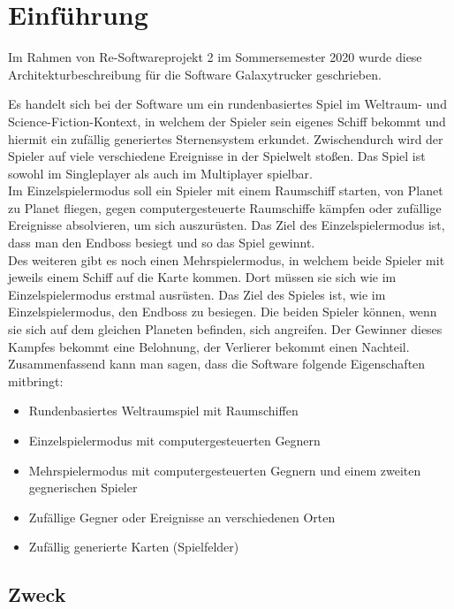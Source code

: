 \documentclass[fontsize=12pt,paper=a4,twoside]{scrartcl}
\begin{document}
\section{Einführung}

Im Rahmen von Re-Softwareprojekt 2 im Sommersemester 2020 wurde diese Architekturbeschreibung für die Software Galaxytrucker geschrieben.

Es handelt sich bei der Software um ein rundenbasiertes Spiel im Weltraum- und Science-Fiction-Kontext, in welchem der Spieler sein eigenes Schiff bekommt und hiermit ein zufällig generiertes Sternensystem erkundet. Zwischendurch wird der Spieler auf viele verschiedene Ereignisse in der Spielwelt stoßen. 
Das Spiel ist sowohl im Singleplayer als auch im Multiplayer spielbar.\\
Im Einzelspielermodus soll ein Spieler mit einem Raumschiff starten, von Planet zu Planet fliegen, gegen computergesteuerte Raumschiffe kämpfen oder zufällige Ereignisse absolvieren, um sich auszurüsten. Das Ziel des Einzelspielermodus ist, dass man den Endboss besiegt und so das Spiel gewinnt. \\
Des weiteren gibt es noch einen Mehrspielermodus, in welchem beide Spieler mit jeweils einem Schiff auf die Karte kommen. Dort müssen sie sich wie im Einzelspielermodus erstmal ausrüsten. Das Ziel des Spieles ist, wie im Einzelspielermodus, den Endboss zu besiegen. Die beiden Spieler können, wenn sie sich auf dem gleichen Planeten befinden, sich angreifen. Der Gewinner dieses Kampfes bekommt eine Belohnung, der Verlierer bekommt einen Nachteil. 
Zusammenfassend kann man sagen, dass die Software folgende Eigenschaften mitbringt: 

\begin{itemize}
\item{Rundenbasiertes Weltraumspiel mit Raumschiffen}
\item{Einzelspielermodus mit computergesteuerten Gegnern}
\item{Mehrspielermodus mit computergesteuerten Gegnern und einem zweiten gegnerischen Spieler}
\item{Zufällige Gegner oder Ereignisse an verschiedenen Orten}
\item{Zufällig generierte Karten (Spielfelder)}
\end{itemize}



\subsection{Zweck}
\end{document}
